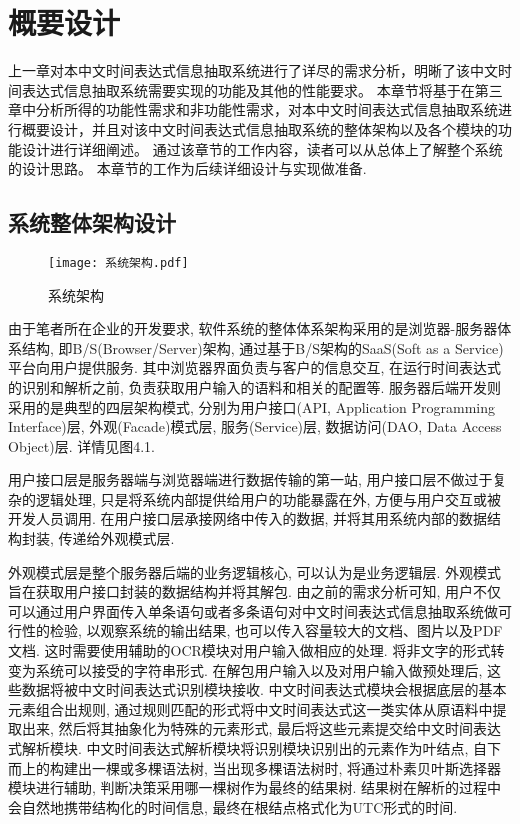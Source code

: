 

\chapter{概要设计}

上一章对本中文时间表达式信息抽取系统进行了详尽的需求分析，明晰了该中文时间表达式信息抽取系统需要实现的功能及其他的性能要求。
本章节将基于在第三章中分析所得的功能性需求和非功能性需求，对本中文时间表达式信息抽取系统进行概要设计，并且对该中文时间表达式信息抽取系统的整体架构以及各个模块的功能设计进行详细阐述。
通过该章节的工作内容，读者可以从总体上了解整个系统的设计思路。
本章节的工作为后续详细设计与实现做准备.

\section{系统整体架构设计}

\begin{figure}[h]
  \centering
  \texttt{[image: 系统架构.pdf]}
  \caption{系统架构}
  \label{fig:architect}
\end{figure}

由于笔者所在企业的开发要求, 软件系统的整体体系架构采用的是浏览器-服务器体系结构, 即B/S(Browser/Server)架构, 通过基于B/S架构的SaaS(Soft as a Service)平台向用户提供服务.
其中浏览器界面负责与客户的信息交互, 在运行时间表达式的识别和解析之前, 负责获取用户输入的语料和相关的配置等.
服务器后端开发则采用的是典型的四层架构模式, 分别为用户接口(API, Application Programming Interface)层, 外观(Facade)模式层, 服务(Service)层, 数据访问(DAO, Data Access Object)层. 详情见图4.1.

用户接口层是服务器端与浏览器端进行数据传输的第一站, 用户接口层不做过于复杂的逻辑处理, 只是将系统内部提供给用户的功能暴露在外, 方便与用户交互或被开发人员调用.
在用户接口层承接网络中传入的数据, 并将其用系统内部的数据结构封装, 传递给外观模式层.

外观模式层是整个服务器后端的业务逻辑核心, 可以认为是业务逻辑层. 外观模式旨在获取用户接口封装的数据结构并将其解包.
由之前的需求分析可知, 用户不仅可以通过用户界面传入单条语句或者多条语句对中文时间表达式信息抽取系统做可行性的检验, 以观察系统的输出结果,
也可以传入容量较大的文档、图片以及PDF文档. 这时需要使用辅助的OCR模块对用户输入做相应的处理. 将非文字的形式转变为系统可以接受的字符串形式.
在解包用户输入以及对用户输入做预处理后, 这些数据将被中文时间表达式识别模块接收.
中文时间表达式模块会根据底层的基本元素组合出规则, 通过规则匹配的形式将中文时间表达式这一类实体从原语料中提取出来, 然后将其抽象化为特殊的元素形式, 最后将这些元素提交给中文时间表达式解析模块.
中文时间表达式解析模块将识别模块识别出的元素作为叶结点, 自下而上的构建出一棵或多棵语法树, 当出现多棵语法树时, 将通过朴素贝叶斯选择器模块进行辅助, 判断决策采用哪一棵树作为最终的结果树.
结果树在解析的过程中会自然地携带结构化的时间信息, 最终在根结点格式化为UTC形式的时间.


